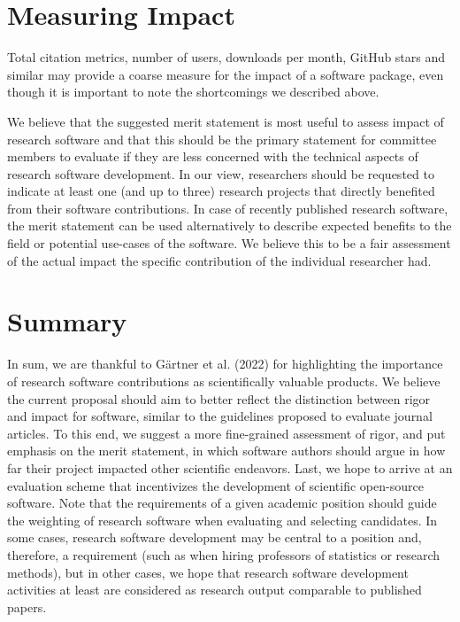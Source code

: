 \documentclass[
  man]{apa6}
\begin{document}
\hypertarget{measuring-impact}{%
\section{Measuring Impact}\label{measuring-impact}}

Total citation metrics, number of users, downloads per month, GitHub stars and similar may provide a coarse measure for the impact of a software package, even though it is important to note the shortcomings we described above.

We believe that the suggested merit statement is most useful to assess impact of research software and that this should be the primary statement for committee members to evaluate if they are less concerned with the technical aspects of research software development.
In our view, researchers should be requested to indicate at least one (and up to three) research projects that directly benefited from their software contributions.
In case of recently published research software, the merit statement can be used alternatively to describe expected benefits to the field or potential use-cases of the software.
We believe this to be a fair assessment of the actual impact the specific contribution of the individual researcher had.

\hypertarget{summary}{%
\section{Summary}\label{summary}}

In sum, we are thankful to Gärtner et al. (2022) for highlighting the importance of research software contributions as scientifically valuable products.
We believe the current proposal should aim to better reflect the distinction between rigor and impact for software, similar to the guidelines proposed to evaluate journal articles.
To this end, we suggest a more fine-grained assessment of rigor, and put emphasis on the merit statement, in which software authors should argue in how far their project impacted other scientific endeavors.
Last, we hope to arrive at an evaluation scheme that incentivizes the development of scientific open-source software.
Note that the requirements of a given academic position should guide the weighting of research software when evaluating and selecting candidates.
In some cases, research software development may be central to a position and, therefore, a requirement (such as when hiring professors of statistics or research methods), but in other cases, we hope that research software development activities at least are considered as research output comparable to published papers.
\end{document}
